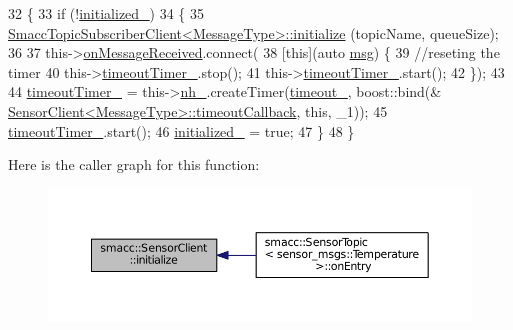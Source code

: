 \begin{DoxyCode}
32   \{
33     \textcolor{keywordflow}{if} (!\hyperlink{classsmacc_1_1SensorClient_a7dde11291a16f6c2edaa02552895ee9e}{initialized\_})
34     \{
35       \hyperlink{classsmacc_1_1SmaccTopicSubscriberClient_a8733cf96ffafbf778b9f2a337113f4f8}{SmaccTopicSubscriberClient<MessageType>::initialize}
      (topicName, queueSize);
36 
37       this->\hyperlink{classsmacc_1_1SmaccTopicSubscriberClient_a4260d955152200804e9c51a1098965c8}{onMessageReceived}.connect(
38           [\textcolor{keyword}{this}](\textcolor{keyword}{auto} \hyperlink{namespacekeyboard__node_a768777e12f75b89e4a0a60acf748e9eb}{msg}) \{
39             \textcolor{comment}{//reseting the timer}
40             this->\hyperlink{classsmacc_1_1SensorClient_a5a82e2fa1f0ccfe2564125fae2f9783a}{timeoutTimer\_}.stop();
41             this->\hyperlink{classsmacc_1_1SensorClient_a5a82e2fa1f0ccfe2564125fae2f9783a}{timeoutTimer\_}.start();
42           \});
43 
44       \hyperlink{classsmacc_1_1SensorClient_a5a82e2fa1f0ccfe2564125fae2f9783a}{timeoutTimer\_} = this->\hyperlink{classsmacc_1_1SmaccTopicSubscriberClient_aed36e84de0628e1a8769be5f87664b59}{nh\_}.createTimer(\hyperlink{classsmacc_1_1SensorClient_a6552f9676fa48d438937c53829ef8f32}{timeout\_}, boost::bind(&
      \hyperlink{classsmacc_1_1SensorClient_ad98d2d5097ea95d2e2bfccdc4b8fe7e2}{SensorClient<MessageType>::timeoutCallback}, \textcolor{keyword}{this}, \_1));
45       \hyperlink{classsmacc_1_1SensorClient_a5a82e2fa1f0ccfe2564125fae2f9783a}{timeoutTimer\_}.start();
46       \hyperlink{classsmacc_1_1SensorClient_a7dde11291a16f6c2edaa02552895ee9e}{initialized\_} = \textcolor{keyword}{true};
47     \}
48   \}
\end{DoxyCode}


Here is the caller graph for this function\+:
\nopagebreak
\begin{figure}[H]
\begin{center}
\leavevmode
\includegraphics[width=350pt]{classsmacc_1_1SensorClient_a281c2ec1790efffae6c36a2e7e0b93c2_icgraph}
\end{center}
\end{figure}


